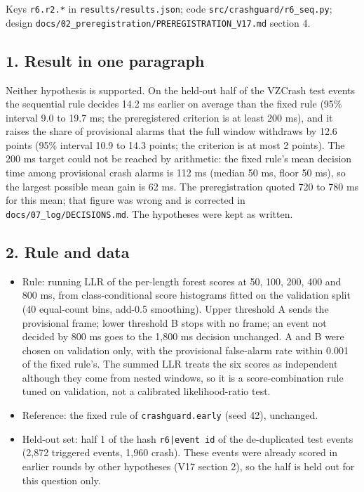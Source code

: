 


Keys \texttt{r6.r2.*} in \texttt{results/results.json}; code \texttt{src/crashguard/r6\_seq.py}; design \texttt{docs/02\_preregistration/PREREGISTRATION\_V17.md} section 4.

\subsection*{1. Result in one paragraph}

Neither hypothesis is supported. On the held-out half of the VZCrash test events the sequential rule decides 14.2 ms earlier on average than the fixed rule (95\% interval 9.0 to 19.7 ms; the preregistered criterion is at least 200 ms), and it raises the share of provisional alarms that the full window withdraws by 12.6 points (95\% interval 10.9 to 14.3 points; the criterion is at most 2 points). The 200 ms target could not be reached by arithmetic: the fixed rule's mean decision time among provisional crash alarms is 112 ms (median 50 ms, floor 50 ms), so the largest possible mean gain is 62 ms. The preregistration quoted 720 to 780 ms for this mean; that figure was wrong and is corrected in \texttt{docs/07\_log/DECISIONS.md}. The hypotheses were kept as written.

\subsection*{2. Rule and data}

\begin{itemize}
\item Rule: running LLR of the per-length forest scores at 50, 100, 200, 400 and 800 ms, from class-conditional score histograms fitted on the validation split (40 equal-count bins, add-0.5 smoothing). Upper threshold A sends the provisional frame; lower threshold B stops with no frame; an event not decided by 800 ms goes to the 1,800 ms decision unchanged. A and B were chosen on validation only, with the provisional false-alarm rate within 0.001 of the fixed rule's. The summed LLR treats the six scores as independent although they come from nested windows, so it is a score-combination rule tuned on validation, not a calibrated likelihood-ratio test.
\item Reference: the fixed rule of \texttt{crashguard.early} (seed 42), unchanged.
\item Held-out set: half 1 of the hash \texttt{r6|event id} of the de-duplicated test events (2,872 triggered events, 1,960 crash). These events were already scored in earlier rounds by other hypotheses (V17 section 2), so the half is held out for this question only.
\end{itemize}

